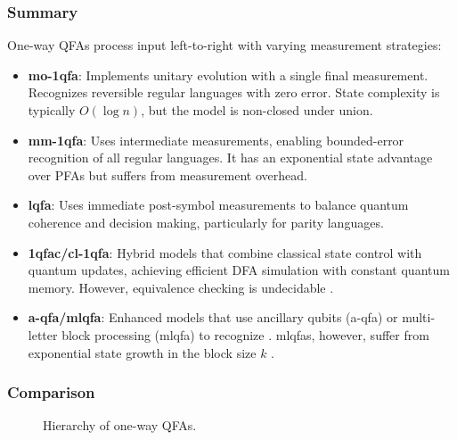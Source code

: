 \subsubsection{Summary}
One-way QFAs process input left-to-right with varying measurement strategies:
\begin{itemize}
    \item \textbf{\gls{mo-1qfa}}: Implements unitary evolution with a single final measurement. Recognizes reversible regular languages with zero error. State complexity is typically $O(\log n)$, but the model is non-closed under union.
    \item \textbf{\gls{mm-1qfa}}: Uses intermediate measurements, enabling bounded-error recognition of all regular languages. It has an exponential state advantage over PFAs but suffers from measurement overhead.
    \item \textbf{\gls{lqfa}}: Uses immediate post-symbol measurements to balance quantum coherence and decision making, particularly for parity languages.
    \item \textbf{\gls{1qfac}/\gls{cl-1qfa}}: Hybrid models that combine classical state control with quantum updates, achieving efficient DFA simulation with constant quantum memory. However, equivalence checking is undecidable \cite{hirvensalo2008}.
    \item \textbf{\gls{a-qfa}/\gls{mlqfa}}: Enhanced models that use ancillary \glspl{qubit} (\gls{a-qfa}) or multi-letter block processing (\gls{mlqfa}) to recognize . \glspl{mlqfa}, however, suffer from exponential state growth in the block size $k$ \cite{ravikumar2003}.
\end{itemize}

\subsubsection{Comparison}
\begin{figure}[ht]
\centering
{}
\caption{Hierarchy of one-way QFAs.}
\label{fig:one_way_hierarchy}
\end{figure}

